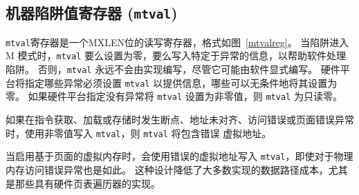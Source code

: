 \FloatBarrier
\subsection{机器陷阱值寄存器 ({\tt mtval})}

\iffalse
The {\tt mtval} register is an MXLEN-bit read-write register formatted as shown
in Figure~\ref{mtvalreg}.  When a trap is taken into M-mode, {\tt mtval} is
either set to zero or written with exception-specific information to assist
software in handling the trap.  Otherwise, {\tt mtval} is never written by the
implementation, though it may be explicitly written by software.  The hardware
platform will specify which exceptions must set {\tt mtval} informatively and
which may unconditionally set it to zero.
If the hardware platform specifies that no exceptions set {\tt mtval} to a
nonzero value, then {\tt mtval} is read-only zero.

If {\tt mtval} is written with a nonzero value when a breakpoint,
address-misaligned, access-fault, or page-fault exception occurs on an
instruction fetch, load, or store, then {\tt mtval} will contain the faulting
virtual address.
\fi
{\tt mtval}寄存器是一个MXLEN位的读写寄存器，格式如图~\ref{mtvalreg}。 当陷阱进入 M 模式时，{\tt mtval} 要么设置为零，要么写入特定于异常的信息，以帮助软件处理陷阱。 否则，{\tt mtval} 永远不会由实现编写，尽管它可能由软件显式编写。 硬件平台将指定哪些异常必须设置 {\tt mtval} 以提供信息，哪些可以无条件地将其设置为零。 如果硬件平台指定没有异常将 {\tt mtval} 设置为非零值，则 {\tt mtval} 为只读零。

如果在指令获取、加载或存储时发生断点、地址未对齐、访问错误或页面错误异常时，使用非零值写入 {\tt mtval}，则 {\tt mtval} 将包含错误 虚拟地址。

\iffalse
\begin{commentary}
  When page-based virtual memory is enabled, {\tt mtval} is written with
  the faulting virtual address, even for physical-memory access-fault exceptions.
  This design reduces datapath cost for most implementations, particularly
  those with hardware page-table walkers.
\end{commentary}
\fi

\begin{commentary}
当启用基于页面的虚拟内存时，会使用错误的虚拟地址写入 {\tt mtval}，即使对于物理内存访问错误异常也是如此。 这种设计降低了大多数实现的数据路径成本，尤其是那些具有硬件页表遍历器的实现。
\end{commentary}

